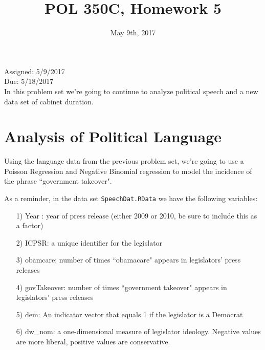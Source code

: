 \documentclass[letterpaper,12pt]{article}
\title{POL 350C, Homework 5}
\date{May 9th, 2017}
\numberwithin{equation}{section}
\numberwithin{equation}{section}
\begin{document}
\maketitle

\noindent Assigned: 5/9/2017\\
Due: 5/18/2017\\

In this problem set we're going to continue to analyze political speech and a new data set of cabinet duration.

\section{Analysis of Political Language}
Using the language data from the previous problem set, we're going to use a Poisson Regression and Negative Binomial regression to model the incidence of the phrase ``government takeover".


As a reminder, in the data set {\tt SpeechDat.RData} we have the following variables:
\begin{itemize}
\item[1)] Year : year of press release (either 2009 or 2010, be sure to include this as a factor)
\item[2)] ICPSR: a unique identifier for the legislator
\item[3)] obamcare: number of times ``obamacare" appears in legislators' press releases
\item[4)] govTakeover: number of times ``government takeover" appears in legislators' press releases
\item[5)] dem: An indicator vector that equals 1 if the legislator is a Democrat
\item[6)] dw\_nom: a one-dimensional measure of legislator ideology.  Negative values are more liberal, positive values are conservative.
\end{itemize}
\end{document}
